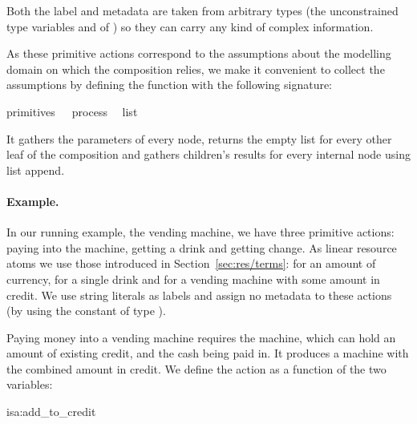 \documentclass[class=smolathesis,crop=false]{standalone}
\begin{document}
Both the label and metadata are taken from arbitrary types (the unconstrained type variables  and  of ) so they can carry any kind of complex information.

As these primitive actions correspond to the assumptions about the modelling domain on which the composition relies, we make it convenient to collect the assumptions by defining the function  with the following signature:
\begin{center}
  \begin{minipage}{0.8\textwidth}
    \begin{isabelle}
      primitives\ \ty\ \ process\isanewline
      \isasymRightarrow\ \ list
    \end{isabelle}
  \end{minipage}
\end{center}
It gathers the parameters of every  node, returns the empty list for every other leaf of the composition and gathers children's results for every internal node using list append.

\paragraph*{Example.}
In our running example, the vending machine, we have three primitive actions: paying into the machine, getting a drink and getting change.
As linear resource atoms we use those introduced in Section~\ref{sec:res/terms}:  for an amount of currency,  for a single drink and  for a vending machine with some amount in credit.
We use string literals as labels and assign no metadata to these actions (by using the constant \isa{\isapars{}} of type ).

Paying money into a vending machine requires the machine, which can hold an amount of existing credit, and the cash being paid in.
It produces a machine with the combined amount in credit.
We define the action as a function of the two variables:
\begin{isadef}{isa:add_to_credit}
  
\end{isadef}
\end{document}
